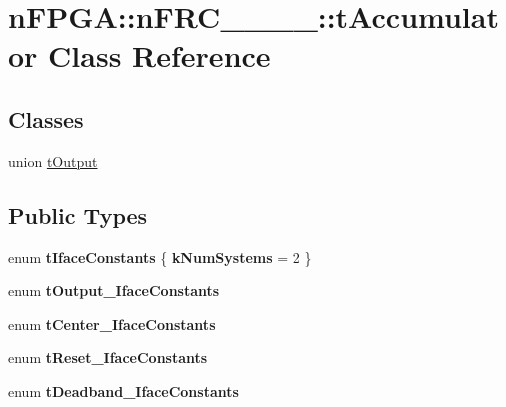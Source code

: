 \hypertarget{classnFPGA_1_1nFRC__2012__1__6__4_1_1tAccumulator}{
\section{nFPGA::nFRC\_\_\_\_::tAccumulator Class Reference}
\label{classnFPGA_1_1nFRC__2012__1__6__4_1_1tAccumulator}
}
\subsection*{Classes}
\begin{DoxyCompactItemize}
\item 
union \hyperlink{unionnFPGA_1_1nFRC__2012__1__6__4_1_1tAccumulator_1_1tOutput}{tOutput}
\end{DoxyCompactItemize}
\subsection*{Public Types}
\begin{DoxyCompactItemize}
\item 
enum {\bfseries tIfaceConstants} \{ {\bfseries kNumSystems} =  2
 \}
\item 
enum {\bfseries tOutput\_\-IfaceConstants} 
\item 
enum {\bfseries tCenter\_\-IfaceConstants} 
\item 
enum {\bfseries tReset\_\-IfaceConstants} 
\item 
enum {\bfseries tDeadband\_\-IfaceConstants} 
\end{DoxyCompactItemize}
